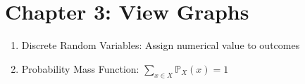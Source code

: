 \section*{Chapter 3: View Graphs}
\begin{enumerate}
    \item Discrete Random Variables: Assign numerical value to outcomes
    \item Probability Mass Function: $\sum_{x\in X}\mathbb{P}_X(x)=1$ 
\end{enumerate}